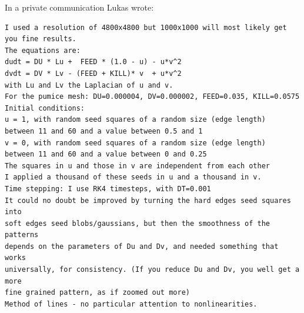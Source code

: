 In a private communication Lukas wrote:
{\small 
\begin{verbatim}
I used a resolution of 4800x4800 but 1000x1000 will most likely get you fine results.
The equations are:
dudt = DU * Lu +  FEED * (1.0 - u) - u*v^2
dvdt = DV * Lv - (FEED + KILL)* v  + u*v^2
with Lu and Lv the Laplacian of u and v.
For the pumice mesh: DU=0.000004, DV=0.000002, FEED=0.035, KILL=0.0575
Initial conditions:
u = 1, with random seed squares of a random size (edge length) 
between 11 and 60 and a value between 0.5 and 1
v = 0, with random seed squares of a random size (edge length) 
between 11 and 60 and a value between 0 and 0.25
The squares in u and those in v are independent from each other
I applied a thousand of these seeds in u and a thousand in v.
Time stepping: I use RK4 timesteps, with DT=0.001
It could no doubt be improved by turning the hard edges seed squares into 
soft edges seed blobs/gaussians, but then the smoothness of the patterns
depends on the parameters of Du and Dv, and needed something that works 
universally, for consistency. (If you reduce Du and Dv, you well get a more 
fine grained pattern, as if zoomed out more) 
Method of lines - no particular attention to nonlinearities. 
\end{verbatim}
}

